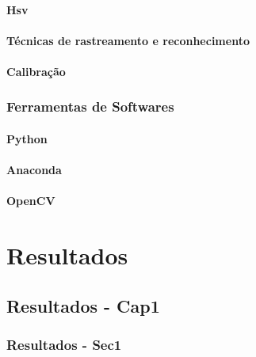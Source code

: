 \documentclass[
	12pt,				%
	openany,			%
	oneside,			%
	a4paper,			%
	english,			%
	french,				%
	spanish,			%
	brazil				%
	]{abntex2}
\begin{document}
	\subsection{Hsv}
	\subsection{Técnicas de rastreamento e reconhecimento}
	\subsection{Calibração}
	
\section{Ferramentas de Softwares}

	\subsection{Python}
	\subsection{Anaconda}
	\subsection{OpenCV}

\part{Resultados}

\chapter{Resultados - Cap1}

\section{Resultados - Sec1}

\end{document}
